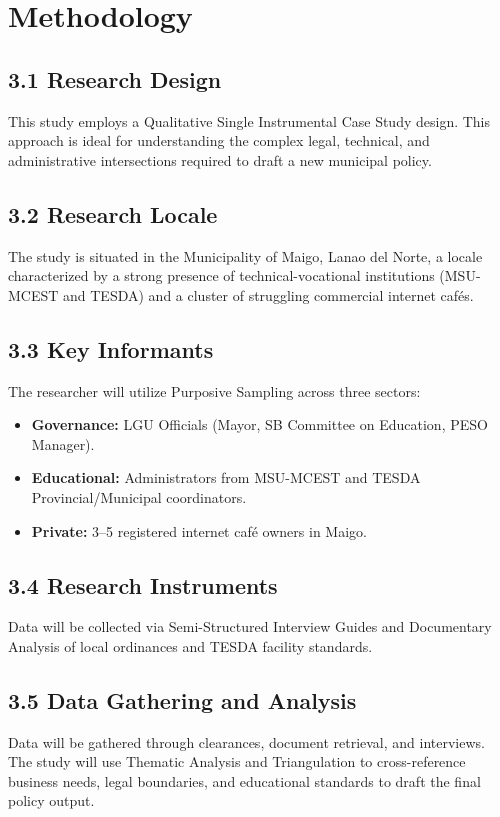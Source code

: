 \section{Methodology}

\subsection*{3.1 Research Design}
This study employs a Qualitative Single Instrumental Case Study design. This approach is ideal for understanding the complex legal, technical, and administrative intersections required to draft a new municipal policy.

\subsection*{3.2 Research Locale}
The study is situated in the Municipality of Maigo, Lanao del Norte, a locale characterized by a strong presence of technical-vocational institutions (MSU-MCEST and TESDA) and a cluster of struggling commercial internet cafés.

\subsection*{3.3 Key Informants}
The researcher will utilize Purposive Sampling across three sectors:
\begin{itemize}
    \item \textbf{Governance:} LGU Officials (Mayor, SB Committee on Education, PESO Manager).
    \item \textbf{Educational:} Administrators from MSU-MCEST and TESDA Provincial/Municipal coordinators.
    \item \textbf{Private:} 3–5 registered internet café owners in Maigo.
\end{itemize}

\subsection*{3.4 Research Instruments}
Data will be collected via Semi-Structured Interview Guides and Documentary Analysis of local ordinances and TESDA facility standards.

\subsection*{3.5 Data Gathering and Analysis}
Data will be gathered through clearances, document retrieval, and interviews. The study will use Thematic Analysis and Triangulation to cross-reference business needs, legal boundaries, and educational standards to draft the final policy output.


